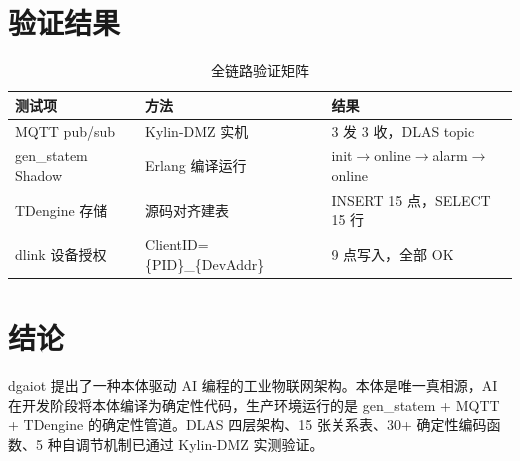 \documentclass[12pt,a4paper]{ctexart}
\begin{document}
\section{验证结果}

\begin{table}[H]\centering\caption{全链路验证矩阵}
\begin{tabular}{p{4cm}p{3cm}p{4cm}}\toprule
\textbf{测试项} & \textbf{方法} & \textbf{结果}\\\midrule
MQTT pub/sub & Kylin-DMZ 实机 & 3 发 3 收，DLAS topic \\
gen\_statem Shadow & Erlang 编译运行 & init$\rightarrow$online$\rightarrow$alarm$\rightarrow$online \\
TDengine 存储 & 源码对齐建表 & INSERT 15 点，SELECT 15 行 \\
dlink 设备授权 & ClientID=\{PID\}\_\{DevAddr\} & 9 点写入，全部 OK \\\bottomrule
\end{tabular}
\end{table}

\section{结论}

dgaiot 提出了一种本体驱动 AI 编程的工业物联网架构。本体是唯一真相源，AI 在开发阶段将本体编译为确定性代码，生产环境运行的是 gen\_statem + MQTT + TDengine 的确定性管道。DLAS 四层架构、15 张关系表、30+ 确定性编码函数、5 种自调节机制已通过 Kylin-DMZ 实测验证。
\end{document}
